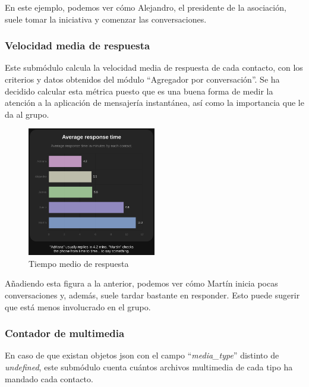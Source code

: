 En este ejemplo, podemos ver cómo Alejandro, el presidente de la asociación, suele tomar la iniciativa y comenzar las conversaciones.


\subsubsection{Velocidad media de respuesta}

Este submódulo calcula la velocidad media de respuesta de cada contacto, con los criterios y datos obtenidos del módulo ``Agregador por conversación''. Se ha decidido calcular esta métrica puesto que es una buena forma de medir la atención a la aplicación de mensajería instantánea, así como la importancia que le da al grupo.

\begin{figure}[H]
	\centering
	\includegraphics[width=0.5\textwidth]{img/avg_response_time.png}
	\caption{Tiempo medio de respuesta}
	\label{fig:chap4:avg_response_time}
\end{figure}

Añadiendo esta figura a la anterior, podemos ver cómo Martín inicia pocas conversaciones y, además, suele tardar bastante en responder. Esto puede sugerir que está menos involucrado en el grupo.



\subsubsection{Contador de multimedia}

En caso de que existan objetos \acrshort{json} con el campo ``\textit{media\_type}'' distinto de \textit{undefined}, este submódulo cuenta cuántos archivos multimedia de cada tipo ha mandado cada contacto.

